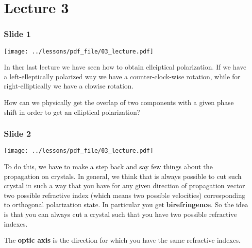 \documentclass[../main/main.tex]{subfiles}
\begin{document}
\pagestyle{plain}

\section{Lecture 3}


\subsubsection*{Slide 1}

\begin{minipage}[]{0.5\linewidth}
\centering
\texttt{[image: ../lessons/pdf\_file/03\_lecture.pdf]}
\end{minipage}
\hspace{0.3cm}\vspace{0.3cm}
\begin{minipage}[c]{0.47\linewidth}

In ther last lecture we have seen how to obtain elleiptical polarization. If we have a left-elleptically polarized way we have a counter-clock-wise rotation, while for right-elliptically we have a clowise rotation.

How can we physically get the overlap of two components with a given phase shift in order to get an elliptical polarization?

\end{minipage}

\subsubsection*{Slide 2}

\begin{minipage}[]{0.5\linewidth}
\centering
\texttt{[image: ../lessons/pdf\_file/03\_lecture.pdf]}
\end{minipage}
\hspace{0.3cm}\vspace{0.3cm}
\begin{minipage}[c]{0.47\linewidth}

To do this, we have to make a step back and say few things about the propagation on crystals. In general, we think that is always possible to cut such crystal in such a way that you have for any given direction of propagation vector two possible refractive index (which means two possible velocities) corresponding to orthogonal polarization state. In particular you get \textbf{birefringence}. So the idea is that you can always cut a crystal such that you have two possible refractive indexes.

The \textbf{optic axis} is the direction for which you have the same refractive indexes.


\end{minipage}
\end{document}
